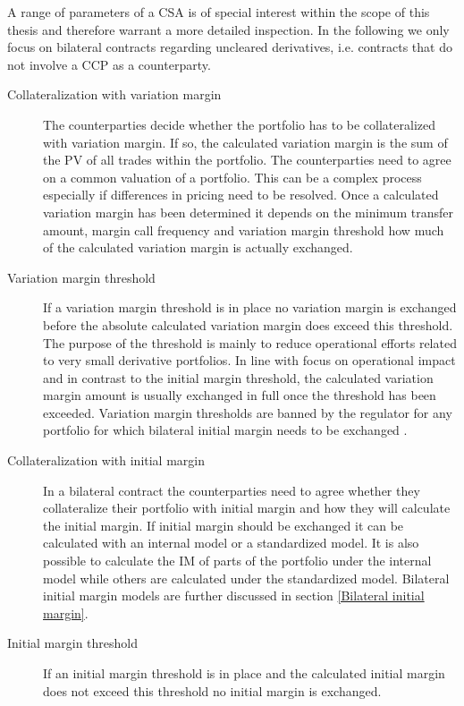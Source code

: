 \documentclass[../Thesis_AHoecherl.tex]{subfiles}
\begin{document}
A range of parameters of a \gls{CSA} is of special interest within the scope of this thesis and therefore warrant a more detailed inspection. 
In the following we only focus on bilateral contracts regarding uncleared derivatives, i.e. contracts that do not involve a \gls{CCP} as a counterparty.

\begin{description}
    \item[Collateralization with variation margin]
    The counterparties decide whether the portfolio has to be collateralized with variation margin.
    If so, the calculated variation margin is the sum of the \gls{PV} of all trades within the portfolio.
    The counterparties need to agree on a common valuation of a portfolio. This can be a complex process especially if differences in pricing need to be resolved.
    Once a calculated variation margin has been determined it depends on the minimum transfer amount, margin call frequency and variation margin threshold how much of the calculated variation margin is actually exchanged. 
    \item[Variation margin threshold]
    If a variation margin threshold is in place no variation margin is exchanged before the absolute calculated variation margin does exceed this threshold.
    The purpose of the threshold is mainly to reduce operational efforts related to very small derivative portfolios. In line with focus on operational impact and in contrast to the initial margin threshold, the calculated variation margin amount is usually exchanged in full once the threshold has been exceeded.
    Variation margin thresholds are banned by the regulator for any portfolio for which bilateral initial margin needs to be exchanged \cite[Requirement 2.1]{BCBS_MarginRequirements}. 
    \item[Collateralization with initial margin]
    In a bilateral contract the counterparties need to agree whether they collateralize their portfolio with initial margin and how they will calculate the initial margin.
    If initial margin should be exchanged it can be calculated with an internal model or a standardized model. It is also possible to calculate the \gls{IM} of parts of the portfolio under the internal model while others are calculated under the standardized model.
    Bilateral initial margin models are further discussed in section \ref{Bilateral initial margin}.
    \item[Initial margin threshold]
    If an initial margin threshold is in place and the calculated initial margin does not exceed this threshold no initial margin is exchanged.

\end{description}
\end{document}
